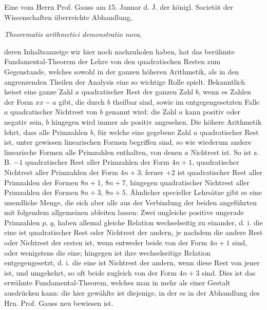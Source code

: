 \documentclass[12pt]{article}
\begin{document}
Eine vom Herrn Prof. Gauss am 15. Januar d. J. der königl. Societät der Wissenschaften überreichte Abhandlung,
\begin{center}\textit{Theorematis arithmetici demonstratio nova},\end{center}
deren Inhaltsanzeige wir hier noch nachzuholen haben, hat das berühmte Fundamental-Theorem der Lehre von den quadratischen Resten zum Gegenstande, welches sowohl in der ganzen höheren Arithmetik, als in den angrenzenden Theilen der Analysis eine so wichtige Rolle spielt. Bekanntlich heisst eine ganze Zahl $a$ quadratischer Rest der ganzen Zahl $b$, wenn es Zahlen der Form $xx-a$ gibt, die durch $b$ theilbar sind, sowie im entgegengesetzten Falle $a$ quadratischer Nichtrest von $b$ genannt wird: die Zahl $a$ kann positiv oder negativ sein, $b$ hingegen wird immer als positiv angesehen. Die höhere Arithmetik lehrt, dass alle Primzahlen $b$, für welche eine gegebene Zahl $a$ quadratischer Rest ist, unter gewissen linearischen Formen begriffen sind, so wie wiederum andere linearische Formen alle Primzahlen enthalten, von denen $a$ Nichtrest ist. So ist z. B. $-1$ quadratischer Rest aller Primzahlen der Form $4n+1$, quadratischer Nichtrest aller Primzahlen der Form $4n+3$; ferner $+2$ ist quadratischer Rest aller Primzahlen der Formen $8n+1$, $8n+7$, hingegen quadratischer Nichtrest aller Primzahlen der Formen $8n+3$, $8n+5$. Ähnlicher specieller Lehrsätze gibt es eine unendliche Menge, die sich aber alle aus der Verbindung der beiden angeführten mit folgendem allgemeinen ableiten lassen: Zwei ungleiche positive ungerade Primzahlen $p$, $q$, haben allemal gleiche Relation wechselseitig zu einander, d. i. die eine ist quadratischer Rest oder Nichtrest der andern, je nachdem die andere Rest oder Nichtrest der ersten ist, wenn entweder beide von der Form $4n+1$ sind, oder wenigstens die eine; hingegen ist ihre wechselseitige Relation entgegengesetzt, d. i. die eine ist Nichtrest der andern, wenn diese Rest von jener ist, und umgekehrt, so oft beide zugleich von der Form $4n+3$ sind. Dies ist das erwähnte Fundamental-Theorem, welches man in mehr als einer Gestalt ausdrücken kann: die hier gewählte ist diejenige, in der es in der Abhandlung des Hrn. Prof. Gauss neu bewiesen ist.
\end{document}
